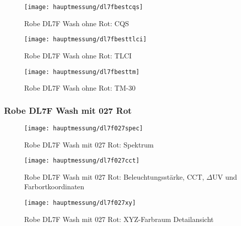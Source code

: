 \documentclass[pagesize,paper=A4,fontsize=12pt,utf8,numbers=noenddot,bibliography=totoc,listof=totoc,DIV=11,BCOR=1mm]{scrreprt}
\begin{document}
\begin{figure}[htp]     %
\centering
\texttt{[image: hauptmessung/dl7fbestcqs]} 
\caption { Robe DL7F Wash ohne Rot: CQS} 
\end{figure}

\begin{figure}[htp]     %
\centering
\texttt{[image: hauptmessung/dl7fbesttlci]} 
\caption { Robe DL7F Wash ohne Rot: TLCI} 
\end{figure}

\begin{figure}[htp]     %
\centering
\texttt{[image: hauptmessung/dl7fbesttm]} 
\caption { Robe DL7F Wash ohne Rot: TM-30} 
\end{figure}

\subsubsection{ Robe DL7F Wash mit 027 Rot}

\begin{figure}[htp]     %
\centering
\texttt{[image: hauptmessung/dl7f027spec]} 
\caption { Robe DL7F Wash mit 027 Rot: Spektrum} 
\end{figure}

\begin{figure}[htp]     %
\centering
\texttt{[image: hauptmessung/dl7f027cct]} 
\caption { Robe DL7F Wash mit 027 Rot: Beleuchtungsstärke, CCT, $\Delta$UV und Farbortkoordinaten} 
\end{figure}

\begin{figure}[htp]     %
\centering
\texttt{[image: hauptmessung/dl7f027xy]} 
\caption { Robe DL7F Wash mit 027 Rot: XYZ-Farbraum Detailansicht} 
\end{figure}
\end{document}
